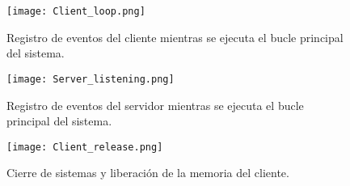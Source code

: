 \begin{figure}[!h]
  \begin{center}
    \texttt{[image: Client\_loop.png]}
    \caption{Registro de eventos del cliente mientras se ejecuta el bucle principal del sistema.}
    \label{fig:Client_loop}
  \end{center}
\end{figure}

\begin{figure}[!h]
  \begin{center}
    \texttt{[image: Server\_listening.png]}
    \caption{Registro de eventos del servidor mientras se ejecuta el bucle principal del sistema.}
    \label{fig:Server_listening}
  \end{center}
\end{figure}

\begin{figure}[!h]
  \begin{center}
    \texttt{[image: Client\_release.png]}
    \caption{Cierre de sistemas y liberación de la memoria del cliente.}
    \label{fig:Client_release}
  \end{center}
\end{figure}

